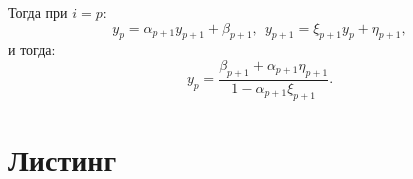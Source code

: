 \documentclass[a4paper,oneside,12pt]{extreport}
\begin{document}
\begin{enumerate}
	Тогда при $i=p$:
	\begin{equation}
		y_p=\alpha_{p+1}y_{p+1}+\beta_{p+1},~~y_{p+1}=\xi_{p+1}y_{p}+\eta_{p+1},
	\end{equation}
	и тогда:
	\begin{equation}
		y_{p}=\frac{\beta_{p+1}+\alpha_{p+1}\eta_{p+1}}{1-\alpha_{p+1}\xi_{p+1}}.
	\end{equation}
\end{enumerate}

\pagebreak
\section*{Листинг}




\end{document}
